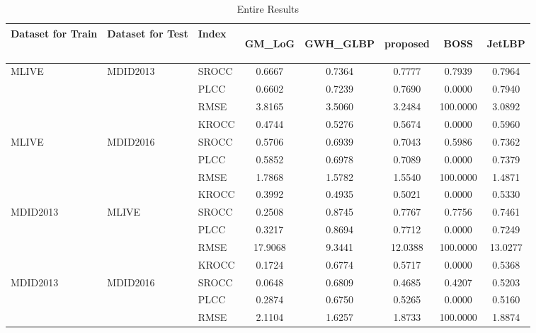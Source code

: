 \documentclass{article}
\begin{document}
\begin{table}
\scriptsize
\caption{Entire Results}
\label{tbl:whole}
\begin{tabular}{||l|l|l||ccccc||}
\toprule
\toprule
\textbf{Dataset for Train}&\textbf{Dataset for Test}&\textbf{Index}&\begin{turn}{-90}\textbf{GM\_LoG}\end{turn}&\begin{turn}{-90}\textbf{GWH\_GLBP}\end{turn}&\begin{turn}{-90}\textbf{proposed}\end{turn}&\begin{turn}{-90}\textbf{BOSS}\end{turn}&\begin{turn}{-90}\textbf{JetLBP}\end{turn}\\
\midrule
\midrule
\multirow{4}{*}{MLIVE}&\multirow{4}{*}{MDID2013}&SROCC&0.6667&0.7364&0.7777&0.7939&0.7964\\
\cmidrule{3-8}
&&PLCC&0.6602&0.7239&0.7690&0.0000&0.7940\\
\cmidrule{3-8}
&&RMSE&3.8165&3.5060&3.2484&100.0000&3.0892\\
\cmidrule{3-8}
&&KROCC&0.4744&0.5276&0.5674&0.0000&0.5960\\
\midrule
\multirow{4}{*}{MLIVE}&\multirow{4}{*}{MDID2016}&SROCC&0.5706&0.6939&0.7043&0.5986&0.7362\\
\cmidrule{3-8}
&&PLCC&0.5852&0.6978&0.7089&0.0000&0.7379\\
\cmidrule{3-8}
&&RMSE&1.7868&1.5782&1.5540&100.0000&1.4871\\
\cmidrule{3-8}
&&KROCC&0.3992&0.4935&0.5021&0.0000&0.5330\\
\midrule
\multirow{4}{*}{MDID2013}&\multirow{4}{*}{MLIVE}&SROCC&0.2508&0.8745&0.7767&0.7756&0.7461\\
\cmidrule{3-8}
&&PLCC&0.3217&0.8694&0.7712&0.0000&0.7249\\
\cmidrule{3-8}
&&RMSE&17.9068&9.3441&12.0388&100.0000&13.0277\\
\cmidrule{3-8}
&&KROCC&0.1724&0.6774&0.5717&0.0000&0.5368\\
\midrule
\multirow{4}{*}{MDID2013}&\multirow{4}{*}{MDID2016}&SROCC&0.0648&0.6809&0.4685&0.4207&0.5203\\
\cmidrule{3-8}
&&PLCC&0.2874&0.6750&0.5265&0.0000&0.5160\\
\cmidrule{3-8}
&&RMSE&2.1104&1.6257&1.8733&100.0000&1.8874\\

\end{tabular}
\end{table}
\end{document}
